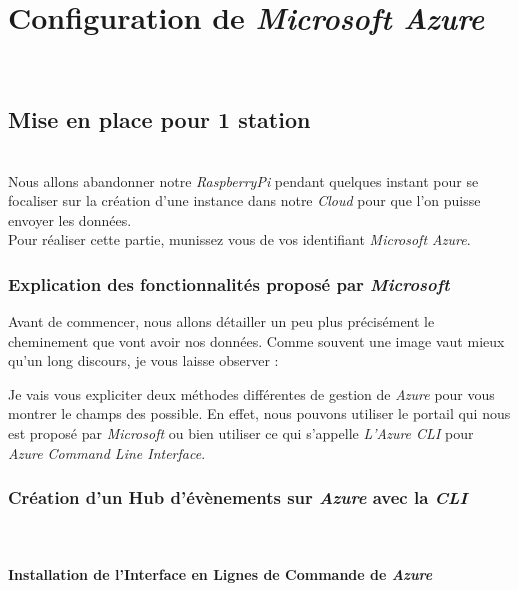 \chapter{Configuration de \textit{Microsoft Azure}}\\

\section{Mise en place pour 1 station}\\

Nous allons abandonner notre \textit{RaspberryPi} pendant quelques instant pour se focaliser sur la création d'une instance dans notre \textit{Cloud} pour que l'on puisse envoyer les données.\\

Pour réaliser cette partie, munissez vous de vos identifiant \textit{Microsoft Azure}.\\

\subsection{Explication des fonctionnalités proposé par \textit{Microsoft}}
Avant de commencer, nous allons détailler un peu plus précisément le cheminement que vont avoir nos données. Comme souvent une image vaut mieux qu'un long discours, je vous laisse observer : 


Je vais vous expliciter deux méthodes différentes de gestion de \textit{Azure} pour vous montrer le champs des possible. En effet, nous pouvons utiliser le portail qui nous est proposé par \textit{Microsoft} ou bien utiliser ce qui s'appelle \textit{L'Azure CLI} pour \textit{Azure Command Line Interface}.

\subsection{Création d'un Hub d'évènements sur \textit{Azure} avec la \textit{CLI}}\\

\subsubsection{Installation de l'Interface en Lignes de Commande de \textit{Azure}}\\


